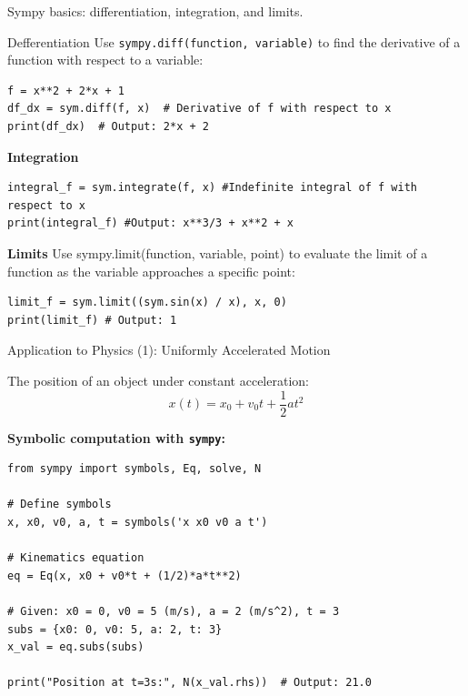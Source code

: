 \documentclass[10pt]{beamer}
\begin{document}
\begin{frame}[fragile]{Sympy basics: differentiation, integration, and limits.}
\begin{block} {Defferentiation}
\vspace*{0.1cm}
Use \texttt{sympy.diff(function, variable)} to find the derivative of a function with respect to a variable:
\begin{lstlisting}[style=mypython]
f = x**2 + 2*x + 1
df_dx = sym.diff(f, x)  # Derivative of f with respect to x
print(df_dx)  # Output: 2*x + 2
\end{lstlisting}
\end{block}	
\vspace{-0.4cm}
\begin{block}{\textbf{Integration}}
\vspace{0.1cm}
\begin{lstlisting}[style=mypython]
integral_f = sym.integrate(f, x) #Indefinite integral of f with respect to x
print(integral_f) #Output: x**3/3 + x**2 + x
\end{lstlisting}
\end{block}
\vspace{-0.4cm}
\begin{block}{\textbf{Limits}}
\vspace{0.1cm}
Use sympy.limit(function, variable, point) to evaluate the limit of a function as the variable approaches a specific point: 
\begin{lstlisting}[style=mypython]
limit_f = sym.limit((sym.sin(x) / x), x, 0)
print(limit_f) # Output: 1
\end{lstlisting}
\end{block}

\end{frame}

\begin{frame}[fragile]{Application to Physics (1): Uniformly Accelerated Motion }

The position of an object under constant acceleration:\vspace{2mm}
\[
x(t) = x_0 + v_0 t + \frac{1}{2} a t^2
\]

\vspace{2mm}
\textbf{Symbolic computation with \texttt{sympy}:}

\begin{lstlisting}[style=mypython]
from sympy import symbols, Eq, solve, N

# Define symbols
x, x0, v0, a, t = symbols('x x0 v0 a t')

# Kinematics equation
eq = Eq(x, x0 + v0*t + (1/2)*a*t**2)

# Given: x0 = 0, v0 = 5 (m/s), a = 2 (m/s^2), t = 3
subs = {x0: 0, v0: 5, a: 2, t: 3}
x_val = eq.subs(subs)

print("Position at t=3s:", N(x_val.rhs))  # Output: 21.0
\end{lstlisting}

\end{frame}
\end{document}
